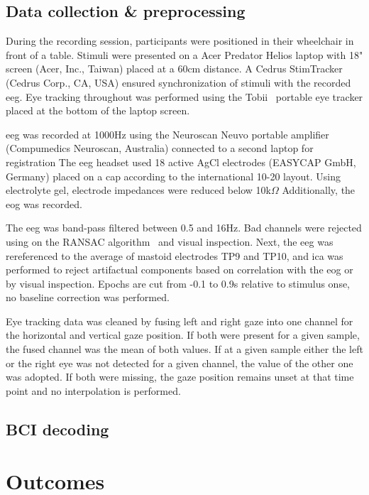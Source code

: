 \subsection{Data collection \& preprocessing}

During the recording session, participants were positioned in their wheelchair in front of a table.
Stimuli were presented on a Acer Predator Helios laptop with 18" screen (Acer,
Inc., Taiwan) placed at a 60cm distance.
A Cedrus StimTracker (Cedrus Corp., CA, USA) ensured synchronization of stimuli with the
recorded \ac{eeg}.
Eye tracking throughout was performed using the Tobii~
portable eye tracker placed at the bottom of the laptop screen.

\Ac{eeg} was recorded at 1000Hz using the Neuroscan Neuvo  portable amplifier (Compumedics Neuroscan,
Australia) connected to a second laptop for registration
The \ac{eeg} headset used 18 active AgCl electrodes (EASYCAP GmbH, Germany) placed on a cap
according to the international 10-20 layout.
Using electrolyte gel, electrode impedances were reduced below 10k$\Omega$
Additionally, the \ac{eog} was recorded.

The \ac{eeg} was band-pass filtered between 0.5 and 16Hz.
Bad channels were rejected using on the RANSAC algorithm~\cite{Fischler1981}
and visual inspection.
Next, the \ac{eeg} was rereferenced to the average of mastoid electrodes TP9
and TP10, and \ac{ica} was performed to reject artifactual components based on
correlation with the \ac{eog} or by visual inspection.
Epochs are cut from -0.1 to 0.9s relative to stimulus onse, no baseline
correction was performed.

Eye tracking data was cleaned by fusing left and right gaze into one channel
for the horizontal and vertical gaze position.
If both were present for a given sample, the fused channel was the mean of both
values.
If at a given sample either the left or the right eye was not detected for a
given channel, the value of the other one was adopted.
If both were missing, the gaze position remains unset at that time point and no
interpolation is performed.

\subsection{BCI decoding}



\section{Outcomes}

